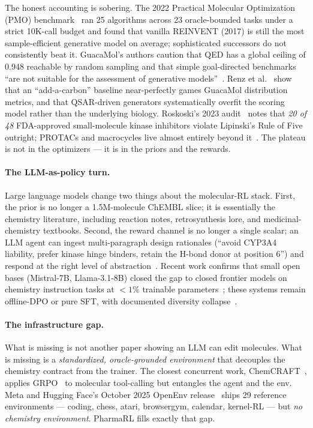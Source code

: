 \documentclass[11pt,a4paper]{article}
\begin{document}
The honest accounting is sobering. The 2022 Practical Molecular Optimization (PMO) benchmark~\cite{gao2022pmo} ran 25 algorithms across 23 oracle-bounded tasks under a strict 10K-call budget and found that vanilla REINVENT (2017) is still the most sample-efficient generative model on average; sophisticated successors do not consistently beat it. GuacaMol's authors caution that QED has a global ceiling of 0.948 reachable by random sampling and that simple goal-directed benchmarks ``are not suitable for the assessment of generative models''~\cite{brown2019guacamol}. Renz et al.~\cite{renz2020failure} show that an ``add-a-carbon'' baseline near-perfectly games GuacaMol distribution metrics, and that QSAR-driven generators systematically overfit the scoring model rather than the underlying biology. Roskoski's 2023 audit~\cite{bhullar2023ro5kinase} notes that \emph{20 of 48} FDA-approved small-molecule kinase inhibitors violate Lipinski's Rule of Five outright; PROTACs and macrocycles live almost entirely beyond it~\cite{degoey2023bro5}. The plateau is not in the optimizers --- it is in the priors and the rewards.

\paragraph{The LLM-as-policy turn.} Large language models change two things about the molecular-RL stack. First, the prior is no longer a 1.5M-molecule ChEMBL slice; it is essentially the chemistry literature, including reaction notes, retrosynthesis lore, and medicinal-chemistry textbooks. Second, the reward channel is no longer a single scalar; an LLM agent can ingest multi-paragraph design rationales (``avoid CYP3A4 liability, prefer kinase hinge binders, retain the H-bond donor at position 6'') and respond at the right level of abstraction~\cite{anstine2024llmmoldesign}. Recent work confirms that small open bases (Mistral-7B, Llama-3.1-8B) closed the gap to closed frontier models on chemistry instruction tasks at $<\!1\%$ trainable parameters~\cite{yu2024llasmol,cavanagh2024smileyllama,zhang2024chemllm}; these systems remain offline-DPO or pure SFT, with documented diversity collapse~\cite{cavanagh2024smileyllama}.

\paragraph{The infrastructure gap.} What is missing is not another paper showing an LLM can edit molecules. What is missing is a \emph{standardized, oracle-grounded environment} that decouples the chemistry contract from the trainer. The closest concurrent work, ChemCRAFT~\cite{chemcraft2026}, applies GRPO~\cite{shao2024deepseekmath} to molecular tool-calling but entangles the agent and the env. Meta and Hugging Face's October 2025 OpenEnv release~\cite{metaopenenv2025,huggingface2025openenv} ships 29 reference environments --- coding, chess, atari, browsergym, calendar, kernel-RL --- but \emph{no chemistry environment}. PharmaRL fills exactly that gap.
\end{document}
